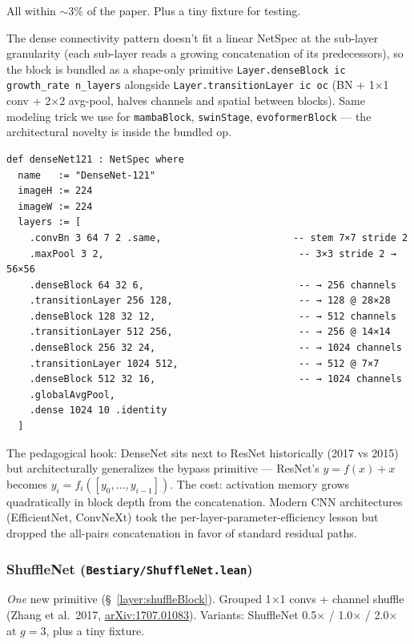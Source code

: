 All within $\sim$3\% of the paper. Plus a tiny fixture for testing.

The dense connectivity pattern doesn't fit a linear NetSpec at the
sub-layer granularity (each sub-layer reads a growing concatenation of
its predecessors), so the block is bundled as a shape-only primitive
\texttt{Layer.denseBlock ic growth\_rate n\_layers} alongside
\texttt{Layer.transitionLayer ic oc} (BN + 1$\times$1 conv +
2$\times$2 avg-pool, halves channels and spatial between blocks).
Same modeling trick we use for \texttt{mambaBlock}, \texttt{swinStage},
\texttt{evoformerBlock} --- the architectural novelty is inside the
bundled op.

\begin{verbatim}
def denseNet121 : NetSpec where
  name   := "DenseNet-121"
  imageH := 224
  imageW := 224
  layers := [
    .convBn 3 64 7 2 .same,                       -- stem 7×7 stride 2
    .maxPool 3 2,                                  -- 3×3 stride 2 → 56×56
    .denseBlock 64 32 6,                           -- → 256 channels
    .transitionLayer 256 128,                      -- → 128 @ 28×28
    .denseBlock 128 32 12,                         -- → 512 channels
    .transitionLayer 512 256,                      -- → 256 @ 14×14
    .denseBlock 256 32 24,                         -- → 1024 channels
    .transitionLayer 1024 512,                     -- → 512 @ 7×7
    .denseBlock 512 32 16,                         -- → 1024 channels
    .globalAvgPool,
    .dense 1024 10 .identity
  ]
\end{verbatim}

The pedagogical hook: DenseNet sits next to ResNet historically (2017
vs 2015) but architecturally generalizes the bypass primitive ---
ResNet's $y = f(x) + x$ becomes $y_i = f_i([y_0, \ldots, y_{i-1}])$.
The cost: activation memory grows quadratically in block depth from
the concatenation. Modern CNN architectures (EfficientNet, ConvNeXt)
took the per-layer-parameter-efficiency lesson but dropped the
all-pairs concatenation in favor of standard residual paths.

\subsubsection*{ShuffleNet (\texttt{Bestiary/ShuffleNet.lean})}
\emph{One} new primitive (\S~\ref{layer:shuffleBlock}). Grouped
1$\times$1 convs + channel shuffle (Zhang et al.\ 2017,
\href{https://arxiv.org/abs/1707.01083}{arXiv:1707.01083}).
Variants: ShuffleNet 0.5$\times$ /
1.0$\times$ / 2.0$\times$ at $g=3$, plus a tiny fixture.

